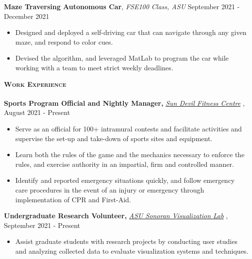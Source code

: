 \documentclass[a4paper]{article}
\newcommand{\lineunder} {
    \vspace*{-8pt} \\
    \hspace*{-18pt} \hrulefill \\
}
\newcommand{\header} [1] {
    {\hspace*{-15pt}\vspace*{3pt} \textsc{#1}}
    \vspace*{-6pt} \lineunder
}
\begin{document}
{\begin{itemize}
\end{itemize}

\textbf{Maze Traversing Autonomous Car}, \textit{FSE100 Class, ASU}
\hfill September 2021 - December 2021\\
\vspace{-3mm}
\begin{itemize}
    \item Designed and deployed a self-driving car that can navigate through any given maze, and respond to color cues. 
    \item Devised the algorithm, and leveraged MatLab to program the car while working with a team to meet strict weekly deadlines. 
\end{itemize}

\vspace{-1mm}
    \header{\textbf{Work Experience}}

\textbf{Sports Program Official and Nightly Manager, } \textit{{\href{https://fitness.asu.edu/programs/intramurals}{Sun Devil Fitness Centre}} \faExternalLink},   \hfill August 2021 - Present\\
\vspace{-3mm}
\begin{itemize}
    \item Serve as an official for 100+ intramural contests and facilitate activities and supervise the set-up and take-down of sports sites and equipment.
    \item Learn both the rules of the game and the mechanics necessary to enforce the rules, and exercise authority in an impartial, firm and controlled manner. 
    \item Identify and reported emergency situations quickly, and follow emergency care procedures in the event of an injury or emergency through implementation of CPR and First-Aid. 
\end{itemize}

\textbf{Undergraduate Research Volunteer, } \textit{\href{https://news.asu.edu/20200225-solutions-data-driven-quest-resilient-power-systems}{ASU Sonoran Visualization Lab} \faExternalLink}, \hfill September 2021 - Present\\
\vspace{-3mm}
\begin{itemize}
    \item Assist graduate students with research projects by conducting user studies and analyzing collected data to evaluate visualization systems and techniques. 
\end{itemize}

}
\end{document}

